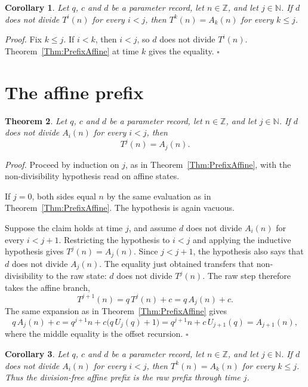 \documentclass[11pt,letterpaper]{article}
\newcommand{\N}{\mathbb{N}}
\newcommand{\Z}{\mathbb{Z}}
\newtheorem{theorem}{Theorem}
\newtheorem{corollary}[theorem]{Corollary}
\newenvironment{proof}{\noindent\textit{Proof.}}{\hfill\(\square\)}
\begin{document}
\begin{corollary}\label{Cor:RawPrefix}
Let \(q\), \(c\) and \(d\) be a parameter record, let \(n\in\Z\), and let \(j\in\N\). If \(d\) does not divide \(T^{i}(n)\) for every \(i<j\), then \(T^{k}(n)=A_{k}(n)\) for every \(k\le j\).
\end{corollary}

\begin{proof}
Fix \(k\le j\). If \(i<k\), then \(i<j\), so \(d\) does not divide \(T^{i}(n)\). Theorem~\ref{Thm:PrefixAffine} at time \(k\) gives the equality.
\end{proof}

\section{The affine prefix}

\begin{theorem}\label{Thm:AffinePrefixRaw}
Let \(q\), \(c\) and \(d\) be a parameter record, let \(n\in\Z\), and let \(j\in\N\). If \(d\) does not divide \(A_{i}(n)\) for every \(i<j\), then
\[
T^{j}(n)=A_{j}(n).
\]
\end{theorem}

\begin{proof}
Proceed by induction on \(j\), as in Theorem~\ref{Thm:PrefixAffine}, with the non-divisibility hypothesis read on affine states.

If \(j=0\), both sides equal \(n\) by the same evaluation as in Theorem~\ref{Thm:PrefixAffine}. The hypothesis is again vacuous.

Suppose the claim holds at time \(j\), and assume \(d\) does not divide \(A_{i}(n)\) for every \(i<j+1\). Restricting the hypothesis to \(i<j\) and applying the inductive hypothesis gives \(T^{j}(n)=A_{j}(n)\). Since \(j<j+1\), the hypothesis also says that \(d\) does not divide \(A_{j}(n)\). The equality just obtained transfers that non-divisibility to the raw state: \(d\) does not divide \(T^{j}(n)\). The raw step therefore takes the affine branch,
\[
T^{j+1}(n)=q\,T^{j}(n)+c=q\,A_{j}(n)+c.
\]
The same expansion as in Theorem~\ref{Thm:PrefixAffine} gives
\[
q\,A_{j}(n)+c=q^{j+1}n+c\bigl(q\,U_{j}(q)+1\bigr)=q^{j+1}n+c\,U_{j+1}(q)=A_{j+1}(n),
\]
where the middle equality is the offset recursion.
\end{proof}

\begin{corollary}\label{Cor:AffinePrefix}
Let \(q\), \(c\) and \(d\) be a parameter record, let \(n\in\Z\), and let \(j\in\N\). If \(d\) does not divide \(A_{i}(n)\) for every \(i<j\), then \(T^{k}(n)=A_{k}(n)\) for every \(k\le j\). Thus the division-free affine prefix is the raw prefix through time \(j\).
\end{corollary}
\end{document}
